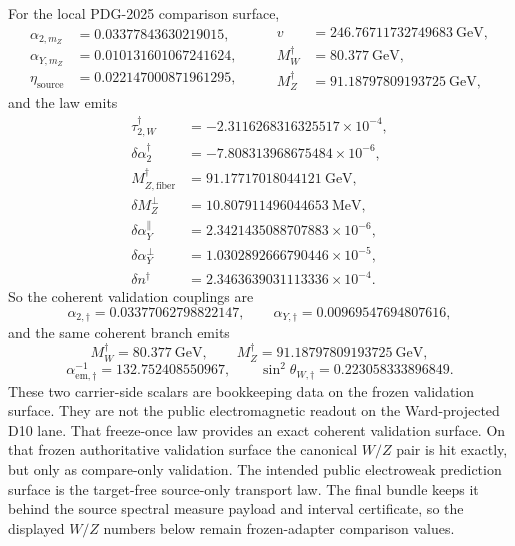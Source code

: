 \documentclass[11pt]{article}
\begin{document}
For the local PDG-2025 comparison surface,
\[
\begin{aligned}
\alpha_{2,m_Z}&=0.03377843630219015,\\
\alpha_{Y,m_Z}&=0.010131601067241624,\\
\eta_{\mathrm{source}}&=0.022147000871961295,
\end{aligned}
\qquad
\begin{aligned}
v&=246.76711732749683~\mathrm{GeV},\\
M_W^\dagger&=80.377~\mathrm{GeV},\\
M_Z^\dagger&=91.18797809193725~\mathrm{GeV},
\end{aligned}
\]
and the law emits
\[
\begin{aligned}
\tau_{2,W}^\dagger&=-2.3116268316325517\times10^{-4},\\
\delta\alpha_2^\dagger&=-7.808313968675484\times10^{-6},\\
M_{Z,\mathrm{fiber}}^\dagger&=91.17717018044121~\mathrm{GeV},\\
\delta M_Z^\perp&=10.807911496044653~\mathrm{MeV},\\
\delta\alpha_Y^\parallel&=2.3421435088707883\times10^{-6},\\
\delta\alpha_Y^\perp&=1.0302892666790446\times10^{-5},\\
\delta n^\dagger&=2.3463639031113336\times10^{-4}.
\end{aligned}
\]
So the coherent validation couplings are
\[
\alpha_{2,\dagger}=0.03377062798822147,
\qquad
\alpha_{Y,\dagger}=0.00969547694807616,
\]
and the same coherent branch emits
\[
M_W^\dagger=80.377~\mathrm{GeV},
\qquad
M_Z^\dagger=91.18797809193725~\mathrm{GeV},
\]
\[
\alpha_{\mathrm{em},\dagger}^{-1}=132.752408550967,
\qquad
\sin^2\theta_{W,\dagger}=0.223058333896849.
\]
These two carrier-side scalars are bookkeeping data on the frozen validation surface. They are not
the public electromagnetic readout on the Ward-projected D10 lane.
That freeze-once law provides an exact coherent validation surface. On that frozen authoritative
validation surface the canonical \(W/Z\) pair is hit exactly, but only as compare-only validation.
The intended public electroweak prediction surface is the target-free source-only transport law.
The final bundle keeps it behind the source spectral measure payload and interval certificate, so the
displayed \(W/Z\) numbers below remain frozen-adapter comparison values.
\end{document}
